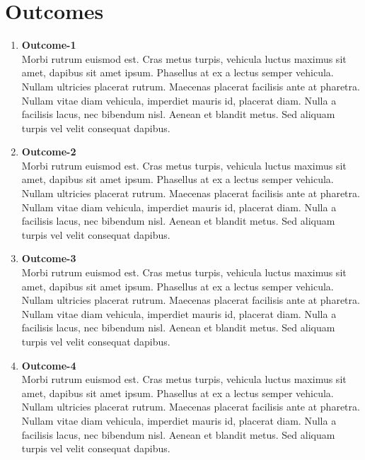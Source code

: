 \documentclass[12pt]{report}
\begin{document}


\chapter{Outcomes}
\bigskip
\begin{enumerate}
    \item \textbf{Outcome-1} \\
   Morbi rutrum euismod est. Cras metus turpis, vehicula luctus maximus sit amet, dapibus sit amet ipsum. Phasellus at ex a lectus semper vehicula. Nullam ultricies placerat rutrum. Maecenas placerat facilisis ante at pharetra. Nullam vitae diam vehicula, imperdiet mauris id, placerat diam. Nulla a facilisis lacus, nec bibendum nisl. Aenean et blandit metus. Sed aliquam turpis vel velit consequat dapibus.

    
    \item \textbf{Outcome-2} \\
    Morbi rutrum euismod est. Cras metus turpis, vehicula luctus maximus sit amet, dapibus sit amet ipsum. Phasellus at ex a lectus semper vehicula. Nullam ultricies placerat rutrum. Maecenas placerat facilisis ante at pharetra. Nullam vitae diam vehicula, imperdiet mauris id, placerat diam. Nulla a facilisis lacus, nec bibendum nisl. Aenean et blandit metus. Sed aliquam turpis vel velit consequat dapibus.

    
    \item \textbf{Outcome-3} \\
    Morbi rutrum euismod est. Cras metus turpis, vehicula luctus maximus sit amet, dapibus sit amet ipsum. Phasellus at ex a lectus semper vehicula. Nullam ultricies placerat rutrum. Maecenas placerat facilisis ante at pharetra. Nullam vitae diam vehicula, imperdiet mauris id, placerat diam. Nulla a facilisis lacus, nec bibendum nisl. Aenean et blandit metus. Sed aliquam turpis vel velit consequat dapibus.

    \item \textbf{Outcome-4} \\
    Morbi rutrum euismod est. Cras metus turpis, vehicula luctus maximus sit amet, dapibus sit amet ipsum. Phasellus at ex a lectus semper vehicula. Nullam ultricies placerat rutrum. Maecenas placerat facilisis ante at pharetra. Nullam vitae diam vehicula, imperdiet mauris id, placerat diam. Nulla a facilisis lacus, nec bibendum nisl. Aenean et blandit metus. Sed aliquam turpis vel velit consequat dapibus.

\end{enumerate}
\end{document}
